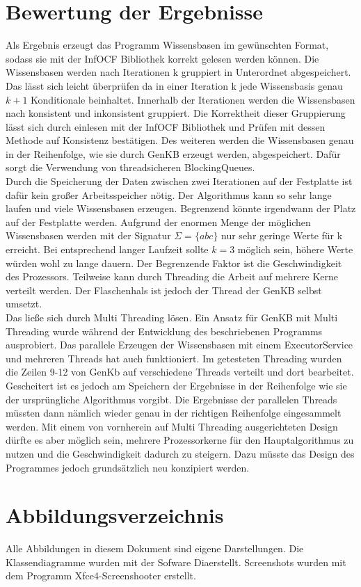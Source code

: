 \documentclass[12pt,a4paper]{article}
\begin{document}
\section{Bewertung der Ergebnisse}
Als Ergebnis erzeugt das Programm Wissensbasen im gewünschten Format, sodass sie mit der InfOCF Bibliothek korrekt gelesen werden können. Die Wissensbasen werden nach Iterationen k gruppiert in Unterordnet abgespeichert. Das lässt sich leicht überprüfen da in einer Iteration k jede Wissensbasis genau $k+1$ Konditionale beinhaltet. Innerhalb der Iterationen werden die Wissensbasen nach konsistent und inkonsistent gruppiert. Die Korrektheit dieser Gruppierung lässt sich durch einlesen mit der InfOCF Bibliothek und Prüfen mit dessen Methode auf Konsistenz bestätigen. Des weiteren werden die Wissensbasen genau in der Reihenfolge, wie sie durch GenKB erzeugt werden, abgespeichert. Dafür sorgt die Verwendung von threadsicheren BlockingQueues. \\
Durch die Speicherung der Daten zwischen zwei Iterationen auf der Festplatte ist dafür kein großer Arbeitsspeicher nötig. Der Algorithmus kann so sehr lange laufen und viele Wissensbasen erzeugen. Begrenzend könnte irgendwann der Platz auf der Festplatte werden. Aufgrund der enormen Menge der möglichen Wissensbasen werden mit der Signatur $\Sigma=\{abc\}$ nur sehr geringe Werte für k erreicht. Bei entsprechend langer Laufzeit sollte $k=3$ möglich sein, höhere Werte würden wohl zu lange dauern. Der Begrenzende Faktor ist die Geschwindigkeit des Prozessors. Teilweise kann durch Threading die Arbeit auf mehrere Kerne verteilt werden. Der Flaschenhals ist jedoch der Thread der GenKB selbst umsetzt.\\
Das ließe sich durch Multi Threading lösen. Ein Ansatz für GenKB mit Multi Threading wurde während der Entwicklung des beschriebenen Programms ausprobiert. Das parallele Erzeugen der Wissensbasen mit einem ExecutorService und mehreren Threads hat auch funktioniert. Im getesteten Threading wurden die Zeilen 9-12 von GenKb auf verschiedene Threads verteilt und dort bearbeitet. Gescheitert ist es jedoch am Speichern der Ergebnisse in der Reihenfolge wie sie der ursprüngliche Algorithmus vorgibt. Die Ergebnisse der parallelen Threads müssten dann nämlich wieder genau in der richtigen Reihenfolge eingesammelt werden. Mit einem von vornherein auf Multi Threading ausgerichteten Design dürfte es aber möglich sein, mehrere Prozessorkerne für den Hauptalgorithmus zu nutzen und die Geschwindigkeit dadurch zu steigern. Dazu müsste das Design des Programmes jedoch grundsätzlich neu konzipiert werden. 


\newpage

\section*{Abbildungsverzeichnis}
Alle Abbildungen in diesem Dokument sind eigene Darstellungen. Die Klassendiagramme wurden mit der Sofware \glqq Dia\grqq \space erstellt. Screenshots wurden mit dem Programm \glqq Xfce4-Screenshooter \grqq \space erstellt.
 
\end{document}
